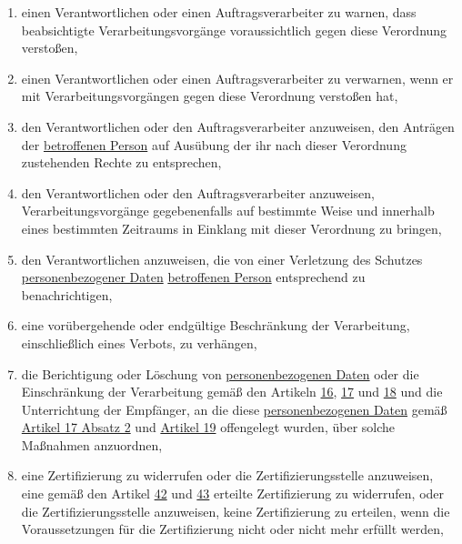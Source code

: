 \begin{enumerate}
  \begin{enumerate}
  
    \item einen Verantwortlichen oder einen Auftragsverarbeiter zu warnen, dass beabsichtigte Verarbeitungsvorgänge
     voraussichtlich gegen diese Verordnung verstoßen,
    \label{itm:58-2a}

    \item einen Verantwortlichen oder einen Auftragsverarbeiter zu verwarnen, wenn er mit Verarbeitungsvorgängen gegen
     diese Verordnung verstoßen hat,
    \label{itm:58-2b}

    \item den Verantwortlichen oder den Auftragsverarbeiter anzuweisen, den Anträgen der \hyperref[itm:04-1]{betroffenen Person} auf Ausübung
     der ihr nach dieser Verordnung zustehenden Rechte zu entsprechen,
    \label{itm:58-2c}

    \item den Verantwortlichen oder den Auftragsverarbeiter anzuweisen, Verarbeitungsvorgänge gegebenenfalls auf
     bestimmte Weise und innerhalb eines bestimmten Zeitraums in Einklang mit dieser Verordnung zu bringen,
    \label{itm:58-2d}

    \item den Verantwortlichen anzuweisen, die von einer Verletzung des Schutzes \hyperref[itm:04-1]{personenbezogener Daten} \hyperref[itm:04-1]{betroffenen
     Person} entsprechend zu benachrichtigen,
    \label{itm:58-2e}

    \item eine vorübergehende oder endgültige Beschränkung der Verarbeitung, einschließlich eines Verbots, zu
     verhängen,
    \label{itm:58-2f}

    \item die Berichtigung oder Löschung von \hyperref[itm:04-1]{personenbezogenen Daten} oder die Einschränkung der Verarbeitung gemäß den
     Artikeln \hyperref[ch:16]{16}, \hyperref[ch:17]{17} und \hyperref[ch:17]{18} und die Unterrichtung der Empfänger,
     an die diese \hyperref[itm:04-1]{personenbezogenen Daten} gemäß \hyperref[itm:17-2]{Artikel 17 Absatz 2} und \hyperref[ch:19]
     {Artikel 19} offengelegt wurden, über solche Maßnahmen anzuordnen,
    \label{itm:58-2g}

    \item eine Zertifizierung zu widerrufen oder die Zertifizierungsstelle anzuweisen, eine gemäß den Artikel \hyperref
     [ch:42]{42} und \hyperref[ch:43]{43} erteilte Zertifizierung zu widerrufen, oder die Zertifizierungsstelle
     anzuweisen, keine Zertifizierung zu erteilen, wenn die Voraussetzungen für die Zertifizierung nicht oder nicht
     mehr erfüllt werden,
    \label{itm:58-2h}


\end{enumerate}
\end{enumerate}
